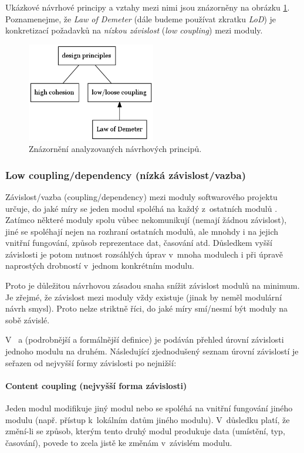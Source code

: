 Ukázkové návrhové principy a vztahy mezi nimi jsou znázorněny na obrázku \ref{analyzed_principles}. Poznamenejme, že \emph{Law of Demeter} (dále budeme používat zkratku \emph{LoD}) je konkretizací požadavků na \emph{nízkou závislost} (\emph{low coupling}) mezi moduly.

\begin{figure}[h!]
  \centering
  \includegraphics[width=0.5\textwidth]{./graphs/oop_design_principles.png}
  \caption{Znázornění analyzovaných návrhových principů.\label{analyzed_principles}}
\end{figure}

\subsubsection{Low coupling/dependency (nízká závislost/vazba)}
Závislost/vazba (coupling/dependency) mezi moduly softwarového projektu určuje, do jaké míry se jeden modul spoléhá na každý z~ostatních modulů \cite{wiki:coupling}. Zatímco některé moduly spolu vůbec nekomunikují (nemají žádnou závislost), jiné se spoléhají nejen na rozhraní ostatních modulů, ale mnohdy i na jejich vnitřní fungování, způsob reprezentace dat, časování atd. Důsledkem vyšší závislosti je potom nutnost rozsáhlých úprav v~mnoha modulech i při úpravě naprostých drobností v~jednom konkrétním modulu.

Proto je důležitou návrhovou zásadou snaha snížit závislost modulů na minimum. Je zřejmé, že závislost mezi moduly vždy existuje (jinak by neměl modulární návrh smysl). Proto nelze striktně říci, do jaké míry smí/nesmí být moduly na sobě závislé.

V~\cite{wiki:coupling} a \cite{STVR:STVR162} (podrobnější a formálnější definice) je podáván přehled úrovní závislosti jednoho modulu na druhém. Následující zjednodušený seznam úrovní závislostí je seřazen od nejvyšší formy závislosti po nejnižší:

\paragraph{Content coupling (nejvyšší forma závislosti)} Jeden modul modifikuje jiný modul nebo se spoléhá na vnitřní fungování jiného modulu (např. přístup k~lokálním datům jiného modulu). V~důsledku platí, že změní-li se způsob, kterým tento druhý modul produkuje data (umístění, typ, časování), povede to zcela jistě ke změnám v~závislém modulu.

